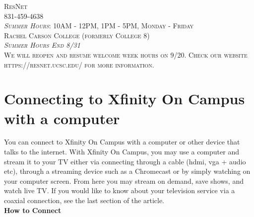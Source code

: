 \documentclass[a4paper, 11pt]{article}
\begin{document}
\begin{titlepage}
	{\scshape ResNet \\ 831-459-4638 \\
          \textit{Summer Hours}: 10AM - 12PM, 1PM - 5PM, Monday - Friday \\
          Rachel Carson College (formerly College 8) \\
          \vfill
          \vfill
          \vfill
          \textit{Summer Hours End 8/31}\\ 
          We will reopen and resume welcome week hours on 9/20.  Check our
          website https://resnet.ucsc.edu/ for more information. 
  } %
	
	\vfill %
	

\end{titlepage}




\section*{
  Connecting to Xfinity On Campus with a computer
}

You can connect to Xfinity On Campus with a computer or other device that
talks to the internet. With Xfinity On Campus, you may
use a computer and stream it to your TV either via connecting through a 
cable (hdmi, vga + audio etc), through a streaming device such as a Chromecast
or by simply watching on your computer screen.
From here you may stream on demand, save shows, and 
watch live TV. If you would like to know about your television service 
via a coaxial connection, see the last section of the article.\\
{\newline}
\textbf{How to Connect}
\end{document}
